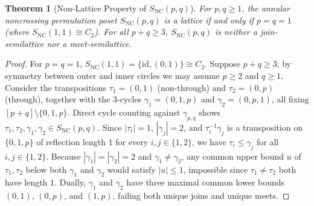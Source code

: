 \documentclass[11pt]{article}
\newtheorem{theorem}{Theorem}[section]
\theoremstyle{definition}
\newcommand{\SNC}{S_{\mathrm{NC}}}
\begin{document}
\begin{theorem}[Non-Lattice Property of $\SNC(p,q)$]\label{thm:snc-nonlattice}
For $p, q \ge 1$, the annular noncrossing permutation poset $\SNC(p,q)$ is a lattice if and only if $p = q = 1$ (where $\SNC(1,1) \cong C_2$). For all $p + q \ge 3$, $\SNC(p,q)$ is neither a join-semilattice nor a meet-semilattice.
\end{theorem}
\begin{proof}
For $p = q = 1$, $\SNC(1,1) = \{\mathrm{id}, (0,1)\} \cong C_2$. Suppose $p + q \ge 3$; by symmetry between outer and inner circles we may assume $p \ge 2$ and $q \ge 1$. Consider the transpositions $\tau_1 = (0,1)$ (non-through) and $\tau_2 = (0, p)$ (through), together with the $3$-cycles $\gamma_1 = (0, 1, p)$ and $\gamma_2 = (0, p, 1)$, all fixing $[p+q] \setminus \{0, 1, p\}$. Direct cycle counting against $\gamma_{p,q}$ shows $\tau_1, \tau_2, \gamma_1, \gamma_2 \in \SNC(p,q)$. Since $|\tau_i| = 1$, $|\gamma_j| = 2$, and $\tau_i^{-1}\gamma_j$ is a transposition on $\{0, 1, p\}$ of reflection length $1$ for every $i, j \in \{1, 2\}$, we have $\tau_i \le \gamma_j$ for all $i, j \in \{1,2\}$. Because $|\gamma_1| = |\gamma_2| = 2$ and $\gamma_1 \ne \gamma_2$, any common upper bound $u$ of $\tau_1, \tau_2$ below both $\gamma_1$ and $\gamma_2$ would satisfy $|u| \le 1$, impossible since $\tau_1 \ne \tau_2$ both have length $1$. Dually, $\gamma_1$ and $\gamma_2$ have three maximal common lower bounds $(0,1)$, $(0,p)$, and $(1,p)$, failing both unique joins and unique meets.
\end{proof}
\end{document}
